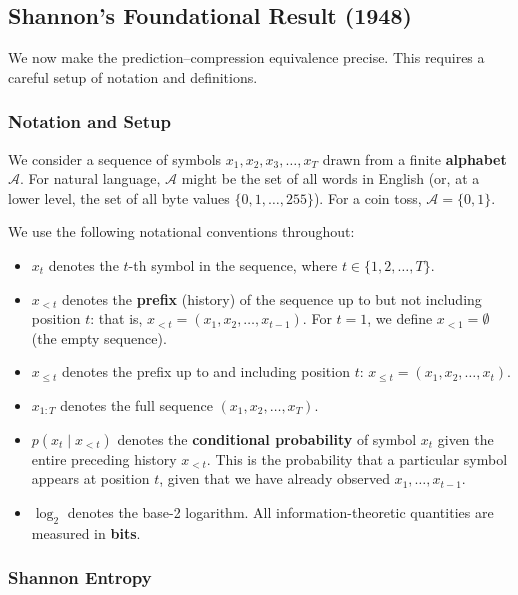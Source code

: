 \documentclass[11pt, a4paper]{article}
\begin{document}
\subsection{Shannon's Foundational Result (1948)}

We now make the prediction--compression equivalence precise. This requires
a careful setup of notation and definitions.

\subsubsection{Notation and Setup}

We consider a sequence of symbols $x_1, x_2, x_3, \ldots, x_T$ drawn from
a finite \textbf{alphabet} $\mathcal{A}$. For natural language, $\mathcal{A}$
might be the set of all words in English (or, at a lower level, the set of
all byte values $\{0, 1, \ldots, 255\}$). For a coin toss, $\mathcal{A} =
\{0, 1\}$.

We use the following notational conventions throughout:
\begin{itemize}[leftmargin=2em]
  \item $x_t$ denotes the $t$-th symbol in the sequence, where
    $t \in \{1, 2, \ldots, T\}$.
  \item $x_{<t}$ denotes the \textbf{prefix} (history) of the sequence up
    to but not including position $t$: that is, $x_{<t} = (x_1, x_2,
    \ldots, x_{t-1})$. For $t = 1$, we define $x_{<1} = \emptyset$ (the
    empty sequence).
  \item $x_{\leq t}$ denotes the prefix up to and including position $t$:
    $x_{\leq t} = (x_1, x_2, \ldots, x_t)$.
  \item $x_{1:T}$ denotes the full sequence $(x_1, x_2, \ldots, x_T)$.
  \item $p(x_t \mid x_{<t})$ denotes the \textbf{conditional probability}
    of symbol $x_t$ given the entire preceding history $x_{<t}$. This is
    the probability that a particular symbol appears at position $t$,
    given that we have already observed $x_1, \ldots, x_{t-1}$.
  \item $\log_2$ denotes the base-2 logarithm. All information-theoretic
    quantities are measured in \textbf{bits}.
\end{itemize}

\subsubsection{Shannon Entropy}
\end{document}
